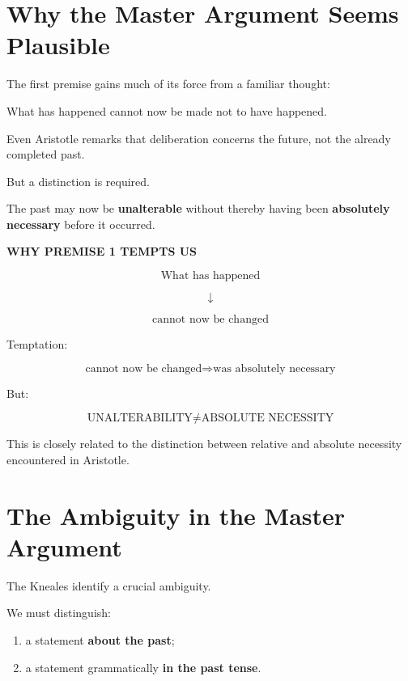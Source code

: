 \documentclass[11pt]{article}
\begin{document}
\section{Why the Master Argument Seems Plausible}

The first premise gains much of its force from a familiar thought:

\begin{center}
What has happened cannot now be made not to have happened.
\end{center}

Even Aristotle remarks that deliberation concerns the future,
not the already completed past.

But a distinction is required.

The past may now be \textbf{unalterable} without thereby having
been \textbf{absolutely necessary} before it occurred.

\begin{whiteboard}
\textbf{WHY PREMISE 1 TEMPTS US}

\[
\text{What has happened}
\]

\[
\downarrow
\]

\[
\text{cannot now be changed}
\]

Temptation:

\[
\text{cannot now be changed}
\Rightarrow
\text{was absolutely necessary}
\]

But:

\[
\boxed{
\text{UNALTERABILITY}
\neq
\text{ABSOLUTE NECESSITY}
}
\]
\end{whiteboard}

This is closely related to the distinction between relative and
absolute necessity encountered in Aristotle.

\section{The Ambiguity in the Master Argument}

The Kneales identify a crucial ambiguity.

We must distinguish:

\begin{enumerate}
    \item a statement \textbf{about the past};
    \item a statement grammatically \textbf{in the past tense}.
\end{enumerate}
\end{document}
